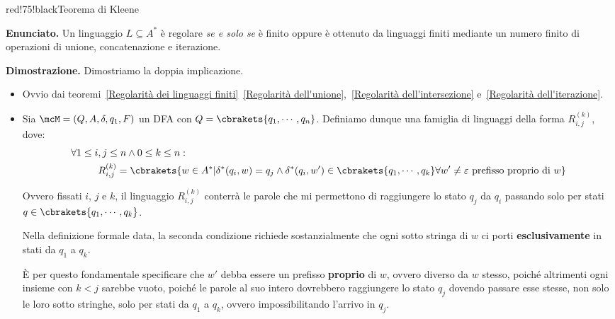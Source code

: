 \begin{halfframedbox}{red!75!black}{Teorema di Kleene}\label{Teorema di Kleene}

  \textbf{Enunciato.} Un linguaggio \(L \subseteq A^*\) è regolare \textit{se e solo se} è finito oppure è ottenuto da linguaggi finiti mediante un numero finito di operazioni di unione, concatenazione e iterazione.

  \begin{center}
    \textcolor{red!75!black}{\hdashrule[0.5ex]{18cm}{1pt}{3mm 3pt 1mm 2pt}}
  \end{center}

  \textbf{Dimostrazione.} Dimostriamo la doppia implicazione.

  \begin{itemize}
    \item [``\(\Rightarrow\)''] Ovvio dai teoremi~\ref{Regolarità dei linguaggi finiti}~\ref{Regolarità dell'unione},~\ref{Regolarità dell'intersezione} e~\ref{Regolarità dell'iterazione}.
    \item [``\(\Leftarrow\)''] Sia \(\mcM=(Q,A,\delta,q_1,F)\) un DFA con \(Q=\cbrakets{q_1,\cdots,q_n}\). Definiamo dunque una famiglia di linguaggi della forma \(R^{(k)}_{i,j}\), dove:
    \begin{equation}
      \begin{split}
        \forall 1 \leq i&, j \leq n \land 0 \leq k \leq n:\\
        &R^{(k)}_{i,j}=\cbrakets{w \in A^* \vert \delta^*(q_i,w)=q_j \land \delta^*(q_i,w') \in \cbrakets{q_1,\cdots,q_k} \forall w'\neq \varepsilon \text{ prefisso proprio di } w }
      \end{split}
    \end{equation}

    Ovvero fissati \(i\), \(j\) e \(k\), il linguaggio \(R^{(k)}_{i,j}\) conterrà le parole che mi permettono di raggiungere lo stato \(q_j\) da \(q_i\) passando solo per stati \(q \in \cbrakets{q_1,\cdots,q_k}\).

    Nella definizione formale data, la seconda condizione richiede sostanzialmente che ogni sotto stringa di \(w\) ci porti \textbf{esclusivamente} in stati da \(q_1\) a \(q_k\).

    È per questo fondamentale specificare che \(w'\) debba essere un prefisso \textbf{proprio} di \(w\), ovvero diverso da \(w\) stesso, poiché altrimenti ogni insieme con \(k<j\) sarebbe vuoto, poiché le parole al suo intero dovrebbero raggiungere lo stato \(q_j\) dovendo passare esse stesse, non solo le loro sotto stringhe, solo per stati da \(q_1\) a \(q_k\), ovvero impossibilitando l'arrivo in \(q_j\).


\end{itemize}
\end{halfframedbox}
